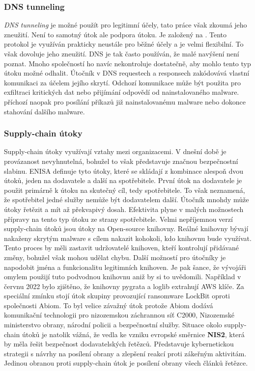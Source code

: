 \subsubsection{DNS tunneling}
\textit{DNS tunneling} je možné použít pro legitimní účely, tato práce však zkoumá jeho zneužití.
Není to samotný útok ale podpora útoku.
Je založený na .
Tento protokol je využíván prakticky neustále pro běžné účely a je velmi flexibilní.
To však dovoluje jeho zneužití.
\ac{DNS} je tak často používán, že malé navýšení není poznat.
Mnoho společností ho navíc nekontroluje dostatečně, aby mohlo tento typ útoku možné odhalit.
Útočník v \ac{DNS} requestech a responsech zakódovává vlastní komunikaci za účelem jejího skrytí.
Odchozí komunikace může být použita pro exfiltraci kritických dat nebo přijímání odpovědí od nainstalovaného malware.
příchozí naopak pro posílání příkazů již nainstalovanému malware nebo dokonce stahování dalšího malware.\cite{cisco_most_common_attack, bright_sec_dns_tunneling}

\subsubsection{Supply-chain útoky}
Supply-chain útoky využívají vztahy mezi organizacemi.
V dnešní době je provázanost nevyhnutelná, bohužel to však představuje značnou bezpečnostní slabinu.
\ac{ENISA} definuje tyto útoky, které se skládají z kombinace alespoň dvou útoků, jeden na dodavatele a další na spotřebitele.
První útok na dodavatele je použit primárně k útoku na skutečný cíl, tedy spotřebitele.
To však neznamená, že spotřebitel jedné služby nemůže být dodavatelem další.
Útočník mnohdy může útoky řetězit a mít až překvapivý dosah.
Efektivita plyne v malých možnostech přípravy na tento typ útoku ze strany spotřebitele.
Velmi nepříjemnou verzí supply-chain útoků jsou útoky na Open-source knihovny.
Reálné knihovny bývají nakaženy skrytým malware s cílem nakazit kohokoli, kdo knihovnu bude využívat.
Tento proces by měli zastavit udržovatelé knihoven, kteří kontrolují přidávané změny, bohužel však mohou udělat chybu.
Další možností pro útočníky je napodobit jména a funkcionalitu legitimních knihoven.
Je pak šance, že vývojáři omylem použijí tuto podvodnou knihovnu aniž by si to uvědomili.
Například v červnu 2022 bylo zjištěno, že knihovny pygrata a loglib extrahují AWS klíče.
Za speciální zmínku stojí útok skupiny provozující ransomware LockBit oproti společnosti Abiom.
To byl velice závažný útok protože Abiom dodává komunikační technologii pro nizozemskou záchrannou síť C2000,
Nizozemské ministerstvo obrany, národní policii a bezpečnostní služby.
Situace okolo supply-chain útoků je natolik vážná, že vedla ke vzniku evropské směrnice \textbf{NIS2}, která by měla řešit bezpečnost dodavatelských řetězců.
Představuje kybernetickou strategii s návrhy na posílení obrany a zlepšení reakcí proti zákeřným aktivitám.
Jedinou obranou proti supply-chain útok je posílení obrany všech článků řetězce.\cite{Enisa_thread_landscape}


